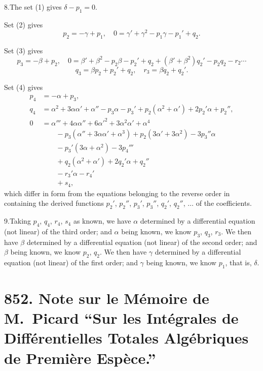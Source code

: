 \documentclass[11pt]{article}
\begin{document}
8.\quad The set (1) gives $\delta-p_1=0$.

Set (2) gives
\[
p_2 = -\gamma+p_1,\quad 0 = \gamma'+\gamma^2-p_1\gamma-p_1'+q_2.
\]

Set (3) gives
\[
p_3 = -\beta+p_2,\quad 0 = \beta'+\beta^2 - p_2\beta - p_2' + q_2 + (\beta'+\beta^2)q_2' - p_2 q_2 - r_2 \cdots
\]
\[
q_3 = \beta p_2 + p_2' + q_2,\quad r_3 = \beta q_2 + q_2'.
\]

Set (4) gives
\begin{align*}
p_4 &= -\alpha+p_3,\\
q_4 &= \alpha^2 + 3\alpha\alpha' + \alpha'' - p_3\alpha - p_3' + p_2(\alpha^2+\alpha') + 2p_2'\alpha + p_2'',\\
0 &= \alpha''' + 4\alpha\alpha'' + 6\alpha'^2 + 3\alpha^2\alpha' + \alpha^4\\
  &\qquad - p_3(\alpha''+3\alpha\alpha'+\alpha^3) + p_2(3\alpha'+3\alpha^2) - 3p_3''\alpha\\
  &\qquad - p_3'(3\alpha+\alpha^2) - 3p_4'''\\
  &\qquad + q_2(\alpha^2+\alpha') + 2q_2'\alpha + q_2''\\
  &\qquad - r_3'\alpha - r_4'\\
  &\qquad + s_4,
\end{align*}
which differ in form from the equations belonging to the reverse order in containing the derived functions $p_2'$, $p_2''$, $p_3'$, $p_3''$, $q_2'$, $q_2''$, $\ldots$ of the coefficients.

\medskip

9.\quad Taking $p_4$, $q_4$, $r_4$, $s_4$ as known, we have $\alpha$ determined by a differential equation (not linear) of the third order; and $\alpha$ being known, we know $p_3$, $q_3$, $r_3$. We then have $\beta$ determined by a differential equation (not linear) of the second order; and $\beta$ being known, we know $p_2$, $q_2$. We then have $\gamma$ determined by a differential equation (not linear) of the first order; and $\gamma$ being known, we know $p_1$, that is, $\delta$.

\vfill

\newpage

\section*{852. Note sur le M\'emoire de M.~Picard ``Sur les Int\'egrales de Diff\'erentielles Totales Alg\'ebriques de Premi\`ere Esp\`ece.''}

\end{document}
